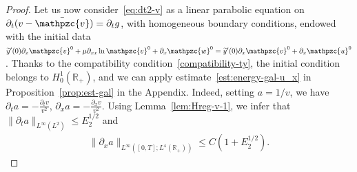\documentclass[AHL,Unicode,longabstracts,published]{cedram}
\newcommand{\R}{\mathbb{R}}
\newcommand{\p}{\partial}
\newcommand{\bv}{\bar{\mathpzc{v}}}
\newcommand{\tv}{\mathpzc{v}}
\newcommand{\tu}{\mathpzc{u}}
\newcommand{\tw}{\mathpzc{w}}
\newcommand{\ty}{\widetilde{y}}
\begin{document}
\begin{proof}
Let us now consider~\eqref{eq:dt2-v} as a linear parabolic equation on $\p_t(v-\bv)=\p_t g$, with homogeneous boundary conditions, endowed with the initial data $\ty'(0)\p_x \tv^0 + \mu \p_{xx}\ln \tv^0 + \partial_x \tw^0= \ty'(0)\p_x \tv^0 + \p_x \tu^0$. Thanks to the compatibility condition~\eqref{compatibility-ty}, the initial condition belongs to $H^1_0(\R_+)$, and we can apply estimate~\eqref{est:energy-gal-u_x} in Proposition~\ref{prop:est-gal} in the Appendix. Indeed, setting $a = 1/v$, we have $\partial_t a = -\frac{\partial_t v}{v^2}$, $\partial_x a = -\frac{\partial_x v}{v^2}$. Using Lemma~\ref{lem:Hreg-v-1}, we infer that $\|\p_t a\|_{L^\infty(L^2)}\leq E_2^{1/2}$ and
\begin{align*}
\|\p_x a\|_{L^\infty\left([0,T];L^4(\R_+)\right)}\leq C\left(1+ E_2^{1/2}\right).
\end{align*}



\end{proof}
\end{document}

